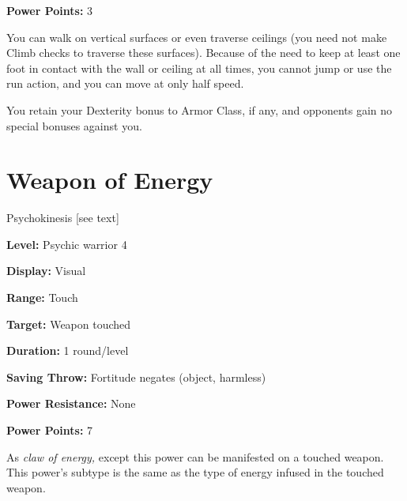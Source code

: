 \documentclass{article}
\begin{document}
\textbf{Power Points:} 3

You can walk on vertical surfaces or even traverse ceilings (you need not make 
Climb checks to traverse these surfaces). Because of the need to keep at least 
one foot in contact with the wall or ceiling at all times, you cannot jump or use 
the run action, and you can move at only half speed.

You retain your Dexterity bonus to Armor Class, if any, and opponents gain no special 
bonuses against you. 

\vspace{12pt}
\section*{Weapon of Energy}

Psychokinesis [see text]

\textbf{Level:} Psychic warrior 4

\textbf{Display:} Visual

\textbf{Range:} Touch

\textbf{Target:} Weapon touched

\textbf{Duration:} 1 round/level

\textbf{Saving Throw:} Fortitude negates (object, harmless)

\textbf{Power Resistance:} None

\textbf{Power Points:} 7

As \textit{claw of energy, }except this power can be manifested on a touched weapon. 
This power's subtype is the same as the type of energy infused in the touched weapon.

\newpage
\end{document}
